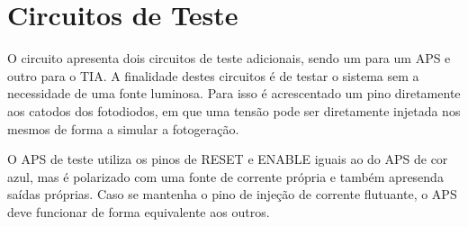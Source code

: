 \section{Circuitos de Teste}
\label{BlocoTestes}

O circuito apresenta dois circuitos de teste adicionais, sendo um para um APS e outro para o TIA. A finalidade destes circuitos \'e de testar o sistema sem a necessidade de uma fonte luminosa. Para isso \'e acrescentado um pino diretamente aos catodos dos fotodiodos, em que uma tensão pode ser diretamente injetada nos mesmos de forma a simular a fotogeração.

O APS de teste utiliza os pinos de RESET e ENABLE iguais ao do APS de cor azul, mas \'e polarizado com uma fonte de corrente pr\'opria e também apresenda sa\'idas pr\'oprias. Caso se mantenha o pino de injeção de corrente flutuante, o APS deve funcionar de forma equivalente aos outros.